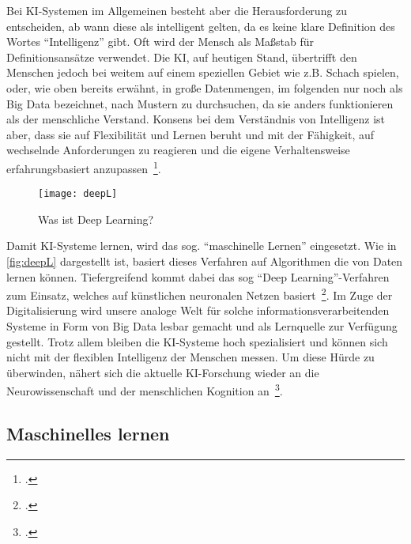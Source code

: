 Bei \ac{KI}-Systemen im Allgemeinen besteht aber die Herausforderung zu entscheiden, ab wann diese als intelligent gelten, da es keine klare Definition des Wortes \enquote{Intelligenz} gibt.
Oft wird der Mensch als Maßstab für Definitionsansätze verwendet. Die \ac{KI}, auf heutigen Stand, übertrifft den Menschen jedoch bei weitem auf einem speziellen Gebiet wie z.B. Schach spielen,
oder, wie oben bereits erwähnt, in große Datenmengen, im folgenden nur noch als Big Data bezeichnet, nach Mustern zu durchsuchen, da sie anders funktionieren als der menschliche Verstand.
Konsens bei dem Verständnis von Intelligenz ist aber, dass sie auf Flexibilität und Lernen beruht und mit der Fähigkeit, auf wechselnde Anforderungen zu reagieren und die eigene 
Verhaltensweise erfahrungsbasiert anzupassen~\footcite[\vglf][]{Lenzen.2020}. 

\begin{figure}[H]
    \caption{Was ist Deep Learning?}
    \texttt{[image: deepL]}
    \label{fig:deepL}
    \\
    \cite[Quelle: Vgl.][]{DeepLearning}
\end{figure}

Damit \ac{KI}-Systeme lernen, wird das sog. \enquote{maschinelle Lernen} eingesetzt. Wie in \autoref{fig:deepL} dargestellt ist, basiert dieses Verfahren auf Algorithmen die von Daten lernen können. Tiefergreifend kommt dabei das 
sog \enquote{Deep Learning}-Verfahren zum Einsatz, welches auf künstlichen neuronalen Netzen basiert~\footcite[\vglf][]{Lenzen.2020}.
Im Zuge der Digitalisierung wird unsere analoge Welt für solche informationsverarbeitenden Systeme in Form von Big Data lesbar gemacht und als Lernquelle zur Verfügung gestellt.
Trotz allem bleiben die \ac{KI}-Systeme hoch spezialisiert und können sich nicht mit der flexiblen Intelligenz der Menschen messen. Um diese Hürde zu überwinden, nähert sich die 
aktuelle \ac{KI}-Forschung wieder an die Neurowissenschaft und der menschlichen Kognition an~\footcite[\vglf][]{Lenzen.2020}.

\subsection{Maschinelles lernen}

